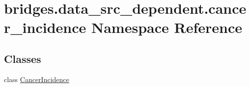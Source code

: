 \hypertarget{namespacebridges_1_1data__src__dependent_1_1cancer__incidence}{}\section{bridges.\+data\+\_\+src\+\_\+dependent.\+cancer\+\_\+incidence Namespace Reference}
\label{namespacebridges_1_1data__src__dependent_1_1cancer__incidence}
\subsection*{Classes}
\begin{DoxyCompactItemize}
\item 
class \hyperlink{classbridges_1_1data__src__dependent_1_1cancer__incidence_1_1_cancer_incidence}{Cancer\+Incidence}
\end{DoxyCompactItemize}
